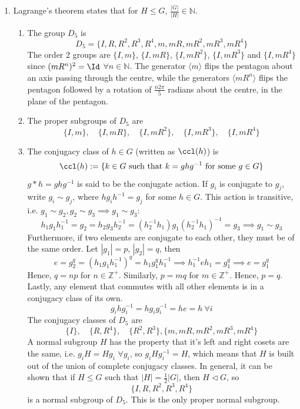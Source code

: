 \documentclass[a4paper]{article}
\begin{document}
\begin{ans}\leavevmode
\begin{enumerate}[label=(\roman*)]
\item Lagrange's theorem states that for $H\leq G$, $\frac{|G|}{|H|}\in\mathbb{N}$.
\begin{enumerate}[label=(\alph*)]
\item The group $D_5$ is
$$D_5=\{I,R,R^2,R^3,R^4,m,mR,mR^2,mR^3,mR^4\}$$
The order 2 groups are $\{I,m\}$, $\{I,mR\}$, $\{I,mR^2\}$, $\{I,mR^3\}$ and $\{I,mR^4\}$ since $(mR^n)^2=\Id$ $\forall n\in\mathbb{N}$. The generator $\langle m\rangle$ flips the pentagon about an axis passing through the centre, while the generators $\langle mR^n\rangle$ flips the pentagon followed by a rotation of $\frac{n2\pi}{5}$ radians about the centre, in the plane of the pentagon.
\item The proper subgroups of $D_5$ are
$$\{I,m\},\quad\{I,mR\},\quad\{I,mR^2\},\quad\{I,mR^3\},\quad\{I,mR^4\}$$
\item The conjugacy class of $h\in G$ (written as $\ccl(h)$) is
$$\ccl(h):=\{k\in G\text{ such that }k=ghg^{-1}\text{ for some }g\in G\}$$
$g*h=ghg^{-1}$ is said to be the conjugate action. If $g_i$ is conjugate to $g_j$, write $g_i\sim g_j$, where $hg_ih^{-1}=g_j$ for some $h\in G$. This action is transitive, i.e. $g_1\sim g_2,g_2\sim g_3\implies g_1\sim g_3$:
$$h_1g_1h_1^{-1}=g_2=h_2g_3h_2^{-1}=(h_2^{-1}h_1)g_1(h_2^{-1}h_1)^{-1}=g_3\implies g_1\sim g_3$$
Furthermore, if two elements are conjugate to each other, they must be of the same order. Let $|g_1|=p$, $|g_2|=q$, then
$$e=g_2^q=(h_1g_1h_1^{-1})^q=h_1g_1^qh_1^{-1}\implies h_1^{-1}eh_1=g_1^q\implies e=g_1^q$$
Hence, $q=np$ for $n\in\mathbb{Z}^+$. Similarly, $p=mq$ for $m\in\mathbb{Z}^+$. Hence, $p=q$.\\[5pt]
Lastly, any element that commutes with all other elements is in a conjugacy class of its own.
$$g_ihg_i^{-1}=hg_ig_i^{-1}=he=h~\forall i$$
The conjugacy classes of $D_5$ are
$$\{I\},\quad\{R,R^4\},\quad\{R^2,R^3\},\{m,mR,mR^2,mR^3,mR^4\}$$
A normal subgroup $H$ has the property that it's left and right cosets are the same, i.e. $g_iH=Hg_i$ $\forall g_i$, so $g_iHg_i^{-1}=H$, which means that $H$ is built out of the union of complete conjugacy classes. In general, it can be shown that if $H\leq G$ such that $|H|=\frac{1}{2}|G|$, then $H\lhd G$, so
$$\{I,R,R^2,R^3,R^4\}$$
is a normal subgroup of $D_5$. This is the only proper normal subgroup.
\end{enumerate}
\end{enumerate}
\end{ans}
\end{document}
